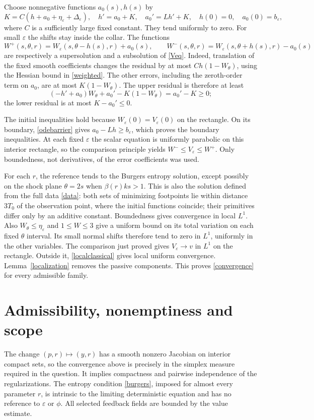 \documentclass[11pt]{article}
\begin{document}
Choose nonnegative functions $a_0(s),h(s)$ by
\begin{equation}\label{odebarrier}
 K=C(h+a_0+\eta_\varepsilon+\Delta_\varepsilon),\quad
 h'=a_0+K,\quad a_0'=Lh'+K,\quad
 h(0)=0,\quad a_0(0)=b_\varepsilon,
\end{equation}
where $C$ is a sufficiently large fixed constant. They tend uniformly to zero. For small $\varepsilon$ the shifts stay inside the collar. The functions
\[
 W^+(s,\theta,r)=W_\varepsilon(s,\theta-h(s),r)+a_0(s),\qquad
 W^-(s,\theta,r)=W_\varepsilon(s,\theta+h(s),r)-a_0(s)
\]
are respectively a supersolution and a subsolution of \eqref{Veq}. Indeed, translation of the fixed smooth coefficients changes the residual by at most $Ch(1-W_\theta)$, using the Hessian bound in \eqref{weighted}. The other errors, including the zeroth-order term on $a_0$, are at most $K(1-W_\theta)$. The upper residual is therefore at least
\[
 (-h'+a_0)W_\theta+a_0'-K(1-W_\theta)=a_0'-K\ge0;
\]
the lower residual is at most $K-a_0'\le0$.

The initial inequalities hold because $W_\varepsilon(0)=V_\varepsilon(0)$ on the rectangle. On its boundary, \eqref{odebarrier} gives $a_0-Lh\ge b_\varepsilon$, which proves the boundary inequalities. At each fixed $\varepsilon$ the scalar equation is uniformly parabolic on this interior rectangle, so the comparison principle yields $W^-\le V_\varepsilon\le W^+$. Only boundedness, not derivatives, of the error coefficients was used.

For each $r$, the reference tends to the Burgers entropy solution, except possibly on the shock plane $\theta=2s$ when $\beta(r)ks>1$. This is also the solution defined from the full data \eqref{data}: both sets of minimizing footpoints lie within distance $3T_0$ of the observation point, where the initial functions coincide; their primitives differ only by an additive constant. Boundedness gives convergence in local $L^1$. Also $W_\theta\le\eta_\varepsilon$ and $1\le W\le3$ give a uniform bound on its total variation on each fixed $\theta$ interval. Its small normal shifts therefore tend to zero in $L^1$, uniformly in the other variables. The comparison just proved gives $V_\varepsilon\to v$ in $L^1$ on the rectangle. Outside it, \eqref{localclassical} gives local uniform convergence. Lemma~\ref{localization} removes the passive components. This proves \eqref{convergence} for every admissible family.

\section{Admissibility, nonemptiness and scope}
The change $(p,r)\mapsto(y,r)$ has a smooth nonzero Jacobian on interior compact sets, so the convergence above is precisely in the simplex measure required in the question. It implies compactness and pairwise independence of the regularizations. The entropy condition \eqref{burgers}, imposed for almost every parameter $r$, is intrinsic to the limiting deterministic equation and has no reference to $\varepsilon$ or $\phi$. All selected feedback fields are bounded by the value estimate.
\end{document}
